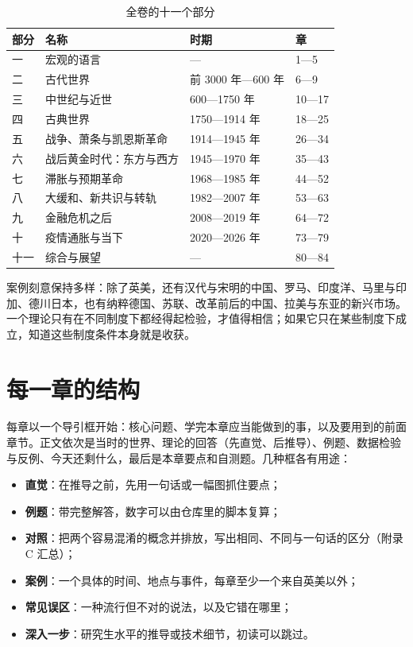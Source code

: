 \begin{table}[htbp]\centering\small
\caption{全卷的十一个部分}
\begin{tabularx}{\linewidth}{@{}l Y l l@{}}
\toprule
部分 & 名称 & 时期 & 章 \\\midrule
一 & 宏观的语言 & — & 1—5 \\
二 & 古代世界 & 前 3000 年—600 年 & 6—9 \\
三 & 中世纪与近世 & 600—1750 年 & 10—17 \\
四 & 古典世界 & 1750—1914 年 & 18—25 \\
五 & 战争、萧条与凯恩斯革命 & 1914—1945 年 & 26—34 \\
六 & 战后黄金时代：东方与西方 & 1945—1970 年 & 35—43 \\
七 & 滞胀与预期革命 & 1968—1985 年 & 44—52 \\
八 & 大缓和、新共识与转轨 & 1982—2007 年 & 53—63 \\
九 & 金融危机之后 & 2008—2019 年 & 64—72 \\
十 & 疫情通胀与当下 & 2020—2026 年 & 73—79 \\
十一 & 综合与展望 & — & 80—84 \\
\bottomrule
\end{tabularx}
\end{table}

案例刻意保持多样：除了英美，还有汉代与宋明的中国、罗马、印度洋、马里与印加、德川日本，也有纳粹德国、苏联、改革前后的中国、拉美与东亚的新兴市场。一个理论只有在不同制度下都经得起检验，才值得相信；如果它只在某些制度下成立，知道这些制度条件本身就是收获。

\section*{每一章的结构}\label{front:boxes}

每章以一个导引框开始：核心问题、学完本章应当能做到的事，以及要用到的前面章节。正文依次是当时的世界、理论的回答（先直觉、后推导）、例题、数据检验与反例、今天还剩什么，最后是本章要点和自测题。几种框各有用途：
\begin{itemize}
\item \textcolor{intuit!85!black}{\sffamily\bfseries 直觉}：在推导之前，先用一句话或一幅图抓住要点；
\item \textcolor{exmp}{\sffamily\bfseries 例题}：带完整解答，数字可以由仓库里的脚本复算；
\item \textcolor{cmp}{\sffamily\bfseries 对照}：把两个容易混淆的概念并排放，写出相同、不同与一句话的区分（附录 C 汇总）；
\item \textcolor{casec}{\sffamily\bfseries 案例}：一个具体的时间、地点与事件，每章至少一个来自英美以外；
\item \textcolor{warn}{\sffamily\bfseries 常见误区}：一种流行但不对的说法，以及它错在哪里；
\item \textcolor{deep}{\sffamily\bfseries 深入一步}：研究生水平的推导或技术细节，初读可以跳过。
\end{itemize}


